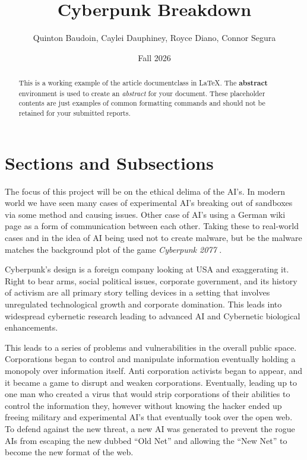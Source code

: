 \documentclass{article}%
\title{Cyberpunk Breakdown}
\author{Quinton Baudoin, Caylei Dauphiney, Royce Diano, Connor Segura}
\date{Fall 2026} %
\begin{document}
\maketitle%

\begin{abstract}
This is a working example of the article documentclass in \LaTeX. The \textbf{abstract} environment is used to create an \textit{abstract} for your document. These placeholder contents are just examples of common formatting commands and should not be retained for your submitted reports.
\end{abstract}


\section{Sections and Subsections}
The focus of this project will be on the ethical delima of the AI’s. In modern world we 
have seen many cases of experimental AI’s breaking out of sandboxes via some method 
and causing issues. Other case of AI’s using a German wiki page as a form of 
communication between each other. Taking these to real-world cases and in the idea of AI 
being used not to create malware, but be the malware matches the background plot of the 
game \textit{Cyberpunk 2077} \cite{Cyberpunk2077}.

Cyberpunk’s design is a foreign company looking at USA and exaggerating it. Right to 
bear arms, social political issues, corporate government, and its history of activism are all 
primary story telling devices in a setting that involves unregulated technological growth and 
corporate domination. This leads into widespread cybernetic research leading to advanced 
AI and Cybernetic biological enhancements. 

This leads to a series of problems and vulnerabilities in the overall public space. 
Corporations began to control and manipulate information eventually holding a monopoly 
over information itself. Anti corporation activists began to appear, and it became a game to 
disrupt and weaken corporations. Eventually, leading up to one man who created a virus 
that would strip corporations of their abilities to control the information they, however 
without knowing the hacker ended up freeing military and experimental AI’s that eventually 
took over the open web. To defend against the new threat, a new AI was generated to 
prevent the rogue AIs from escaping the new dubbed “Old Net” and allowing the “New Net” 
to become the new format of the web. 
\end{document}

